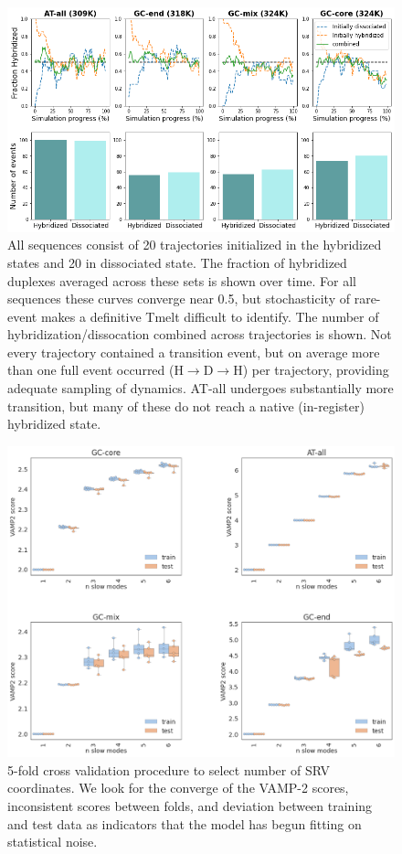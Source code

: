 \documentclass[journal=jpcbfk,manuscript=article]{achemso}
\begin{document}
\begin{figure}[ht!]
	\begin{center}
        \includegraphics[width=120mm, 
        scale=0.5]{Figs/figs_imp/allseq_event_count.png}
        \caption{All sequences consist of 20 trajectories initialized in the hybridized states and 20 in dissociated state. The fraction of hybridized duplexes averaged across these sets is shown over time. For all sequences these curves converge near 0.5, but stochasticity of rare-event makes a definitive Tmelt difficult to identify. The number of hybridization/dissocation combined across trajectories is shown. Not every trajectory contained a transition event, but on average more than one full event occurred (H$\rightarrow$D$\rightarrow$H) per trajectory, providing adequate sampling of dynamics. AT-all undergoes substantially more transition, but many of these do not reach a native (in-register) hybridized state.}
        \label{fig:allseq_event_count}
	\end{center}
\end{figure}

\begin{figure}[ht!]
	\begin{center}
        \includegraphics[width=120mm, 
        scale=0.5]{Figs/figs_imp/allseq_crossval.png}
        \caption{5-fold cross validation procedure to select number of SRV coordinates. We look for the converge of the VAMP-2 scores, inconsistent scores between folds, and deviation between training and test data as indicators that the model has begun fitting on statistical noise.}
        \label{fig:allseq_srv_crossval}
	\end{center}
\end{figure}
\end{document}
